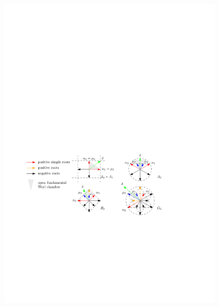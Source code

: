 \begin{itemize}
	\begin{figure}[H]
		\centering
		\includegraphics[scale=1]{figures/fundamental wights and half the sum of the positive roots in rank-two systems.pdf}
	\end{figure}
\end{itemize}

